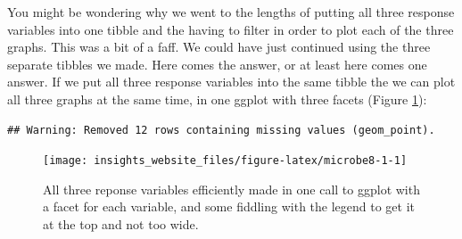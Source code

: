 \documentclass[]{book}
\newenvironment{Shaded}{\begin{snugshade}}{\end{snugshade}}
\newcommand{\DataTypeTok}[1]{\textcolor[rgb]{0.13,0.29,0.53}{#1}}
\newcommand{\DecValTok}[1]{\textcolor[rgb]{0.00,0.00,0.81}{#1}}
\newcommand{\FloatTok}[1]{\textcolor[rgb]{0.00,0.00,0.81}{#1}}
\newcommand{\KeywordTok}[1]{\textcolor[rgb]{0.13,0.29,0.53}{\textbf{#1}}}
\newcommand{\NormalTok}[1]{#1}
\newcommand{\OperatorTok}[1]{\textcolor[rgb]{0.81,0.36,0.00}{\textbf{#1}}}
\newcommand{\StringTok}[1]{\textcolor[rgb]{0.31,0.60,0.02}{#1}}
\begin{document}
You might be wondering why we went to the lengths of putting all three response variables into one tibble and the having to filter in order to plot each of the three graphs. This was a bit of a faff. We could have just continued using the three separate tibbles we made. Here comes the answer, or at least here comes one answer. If we put all three response variables into the same tibble the we can plot all three graphs at the same time, in one ggplot with three facets (Figure \ref{fig:microbe8-1}):

\begin{Shaded}
\end{Shaded}

\begin{verbatim}
## Warning: Removed 12 rows containing missing values (geom_point).
\end{verbatim}

\begin{figure}

{\centering \texttt{[image: insights\_website\_files/figure-latex/microbe8-1-1]} 

}

\caption{All three reponse variables efficiently made in one call to ggplot with a facet for each variable, and some fiddling with the legend to get it at the top and not too wide.}\label{fig:microbe8-1}
\end{figure}
\end{document}
